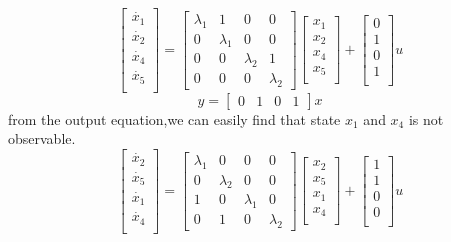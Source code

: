 \documentclass{article}
\begin{document}
\[
\left[
    \begin{array}{c}
        \dot{x_1}\\
        \dot{x_2}\\
        \dot{x_4}\\
        \dot{x_5}\\
    \end{array}
\right]=
\left[
    \begin{array}{cccc}
        \lambda_1 & 1 & 0 & 0\\
        0 & \lambda_1 & 0 & 0\\
        0 & 0 & \lambda_2 & 1\\
        0 & 0 & 0 & \lambda_2
    \end{array}
\right]
\left[
    \begin{array}{c}
        x_1\\
        x_2\\
        x_4\\
        x_5\\
    \end{array}
\right]+
\left[
    \begin{array}{c}
        0\\
        1\\
        0\\
        1\\
    \end{array}
\right]u
\] 
\[
y=
\left[
    \begin{array}{cccc}
        0 & 1 & 0 & 1 
    \end{array}
\right]x
\]
from the output equation,we can easily find that state $x_1$ and $x_4$ is not observable.
\[
\left[
    \begin{array}{c}
        \dot{x_2}\\
        \dot{x_5}\\
        \dot{x_1}\\
        \dot{x_4}\\
    \end{array}
\right]=
\left[
    \begin{array}{cccc}
        \lambda_1 & 0 & 0 & 0\\
        0 & \lambda_2 & 0 & 0\\
        1 & 0 & \lambda_1 & 0\\
        0 & 1 & 0 & \lambda_2
    \end{array}
\right]
\left[
    \begin{array}{c}
        x_2\\
        x_5\\
        x_1\\
        x_4\\
    \end{array}
\right]+
\left[
    \begin{array}{c}
        1\\
        1\\
        0\\
        0\\
    \end{array}
\right]u
\] 
\end{document}
